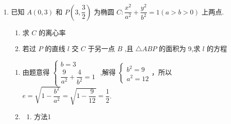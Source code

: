 \begin{enumerate}
\begin{jieda}
\begin{enumerate}
\begin{enumerate}
                \item 方法2 
                
                联立$\left\{ \begin{array}{l}
                 x - {2y} = m  \\
                 \dfrac{{x}^{2}}{16} + \dfrac{{y}^{2}}{12} = 1 
                \end{array}\right. $ 可得: $3{\left( m + 2y\right) }^{2} + 4{y}^{2} = {48}$，化简可得: ${16}{y}^{2} + {12my} + 3{m}^{2} - {48} = 0$
                
                所以 $\Delta  = {144}{m}^{2} - 4 \times  {16}\left( {3{m}^{2} - {48}}\right)  = 0$ ,即 ${m}^{2} = {64}$ ,解得 $m =  \pm  8$
            \end{enumerate}
            
            故与 ${AM}$ 距离比较远的直线方程: $x - {2y} = 8$，点 $N$ 到直线 ${AM}$ 的距离即两平行线之间的距离
            
            利用平行线之间的距离公式可得: $d = \dfrac{8 + 4}{\sqrt{1 + 4}} = \dfrac{{12}\sqrt{5}}{5}$
            
            由两点之间距离公式可得 $\left| {AM}\right|  = \sqrt{{\left( 2 + 4\right) }^{2} + {3}^{2}} = 3\sqrt{5}$ .
            
            所以 $\bigtriangleup {AMN}$ 的面积的最大值: $\dfrac{1}{2} \times  3\sqrt{5} \times  \dfrac{{12}\sqrt{5}}{5} = {18}$ .
        \end{enumerate}

    \end{jieda}
    
    \item 已知 $A\left( {0,3}\right)$ 和 $P\left( {3,\dfrac{3}{2}}\right)$ 为椭圆 $C : \dfrac{{x}^{2}}{{a}^{2}} + \dfrac{{y}^{2}}{{b}^{2}} = 1\left( {a > b > 0}\right)$ 上两点.
    \begin{enumerate}
        \item 求 $C$ 的离心率
        \item 若过 $P$ 的直线 $l$ 交 $C$ 于另一点 $B$ ,且 $\bigtriangleup  {ABP}$ 的面积为 9,求 $l$ 的方程
    \end{enumerate}
    \begin{jieda}
        \begin{enumerate}
            \item 由题意得 $\left\{  \begin{matrix} b = 3 \\  \dfrac{9}{{a}^{2}} + \dfrac{4}{{b}^{2}} = 1 \end{matrix}\right.$ ,解得 $\left\{  \begin{matrix} {b}^{2} = 9 \\  {a}^{2} = {12} \end{matrix}\right.$，所以 $e = \sqrt{1 - \dfrac{{b}^{2}}{{a}^{2}}} = \sqrt{1 - \dfrac{9}{12}} = \dfrac{1}{2}$.
            \item \begin{enumerate}
                \item 方法1 


\end{enumerate}
\end{enumerate}
\end{jieda}
\end{enumerate}
